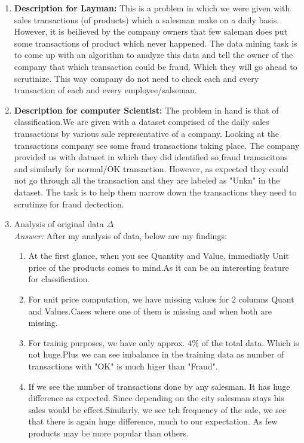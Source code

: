 \documentclass{article}
\begin{document}
	\begin{enumerate}
		\item \textbf{Description for Layman:}
		This is a problem in which we were given with sales transactions (of products) which a salesman make on a daily basis. However, it is beilieved by the company owners that few saleman does put some transactions of product which never happened. The data mining task is to come up with an algorithm to analyze this data and tell the owner of the company that which transaction could be fraud. Which they will go ahead to scrutinize. This way company do not need to check each and every transaction of each and every employee/salseman.

		\item \textbf{Description for computer Scientist:}
		The problem in hand is that of classification.We are given with a dataset comprised of the daily sales transactions by various sale representative of a company. Looking at the transactions company see some fraud transactions taking place. The company provided us with dataset in which they did identified so fraud transacitons and similarly for normal/OK transaction. However, as expected they could not go through all the transaction and they are labeled as "Unkn" in the dataset. The task is to help them narrow down the transactions they need to scrutinze for fraud dectection.
		\item Analysis of original data $\Delta$\\
		\emph{Answer:} After my analysis of data, below are my findings:
		\begin{enumerate}
			\item At the first glance, when you see Quantity and Value, immediatly Unit price of the products comes to 	mind.As it can be an interesting feature for classification.
			\item For unit price computation, we have missing values for 2 columns Quant and Values.Cases where one of them is missing and when both are missing.
			\item For trainig purposes, we have only approx. $4\%$ of the total data. Which is not huge.Plus we can see imbalance in the training data as number of transactions with "OK" is much higer than "Fraud".
			\item If we see the number of transactions done by any salesman. It has huge difference as expected. Since depending on the city salesman stays his sales would be effect.Similarly, we see teh frequency of the sale, we see that there is again huge difference, much to our expectation. As few products may be more popular than others.

\end{enumerate}
\end{enumerate}
\end{document}
